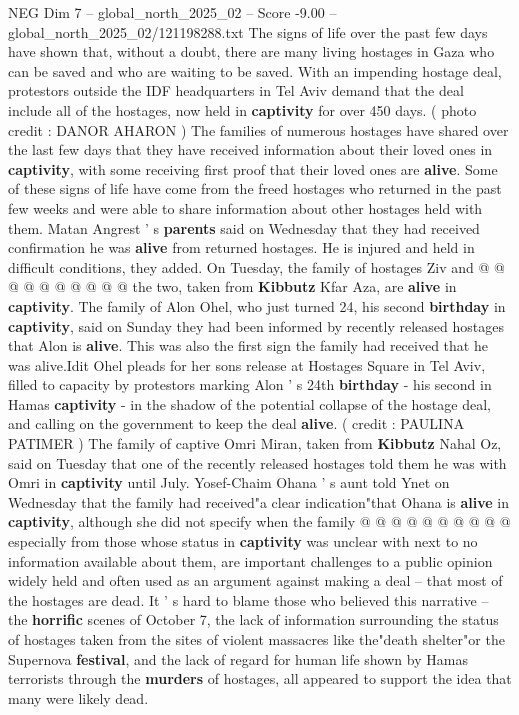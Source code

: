 \begin{textsample}{NEG Dim 7 – global\_north\_2025\_02 – Score -9.00 – global\_north\_2025\_02/121198288.txt}  \label{ex:f7_neg_070}
The signs of life over the past few days have shown that, without a doubt, there are many living hostages in Gaza who can be saved and who are waiting to be saved.
With an impending hostage deal, protestors outside the IDF headquarters in Tel Aviv demand that the deal include all of the hostages, now held in \textbf{captivity} for over 450 days. ( photo credit : DANOR AHARON ) The families of numerous hostages have shared over the last few days that they have received information about their loved ones in \textbf{captivity}, with some receiving first proof that their loved ones are \textbf{alive}.
Some of these signs of life have come from the freed hostages who returned in the past few weeks and were able to share information about other hostages held with them.
Matan Angrest ' s \textbf{parents} said on Wednesday that they had received confirmation he was \textbf{alive} from returned hostages.
He is injured and held in difficult conditions, they added.
On Tuesday, the family of hostages Ziv and @ @ @ @ @ @ @ @ @ @ the two, taken from \textbf{Kibbutz} Kfar Aza, are \textbf{alive} in \textbf{captivity}.
The family of Alon Ohel, who just turned 24, his second \textbf{birthday} in \textbf{captivity}, said on Sunday they had been informed by recently released hostages that Alon is \textbf{alive}.
This was also the first sign the family had received that he was alive.Idit Ohel pleads for her sons release at Hostages Square in Tel Aviv, filled to capacity by protestors marking Alon ' s 24th \textbf{birthday} - his second in Hamas \textbf{captivity} - in the shadow of the potential collapse of the hostage deal, and calling on the government to keep the deal \textbf{alive}. ( credit : PAULINA PATIMER ) The family of captive Omri Miran, taken from \textbf{Kibbutz} Nahal Oz, said on Tuesday that one of the recently released hostages told them he was with Omri in \textbf{captivity} until July.
Yosef-Chaim Ohana ' s aunt told Ynet on Wednesday that the family had received"a clear indication"that Ohana is \textbf{alive} in \textbf{captivity}, although she did not specify when the family @ @ @ @ @ @ @ @ @ @ especially from those whose status in \textbf{captivity} was unclear with next to no information available about them, are important challenges to a public opinion widely held and often used as an argument against making a deal -- that most of the hostages are dead.
It ' s hard to blame those who believed this narrative -- the \textbf{horrific} scenes of October 7, the lack of information surrounding the status of hostages taken from the sites of violent massacres like the"death shelter"or the Supernova \textbf{festival}, and the lack of regard for human life shown by Hamas terrorists through the \textbf{murders} of hostages, all appeared to support the idea that many were likely dead.

\end{textsample}
